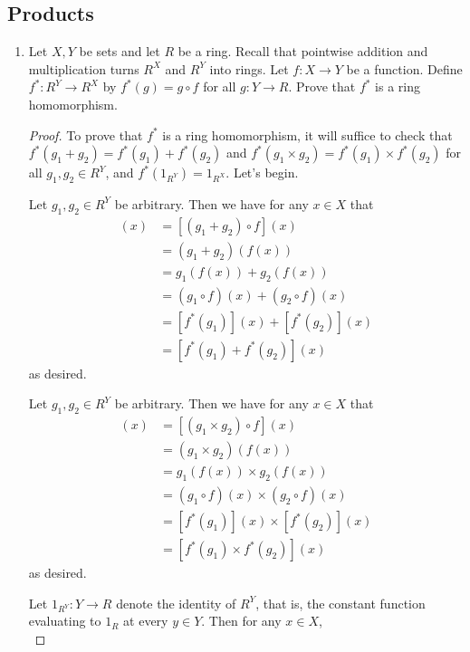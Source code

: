 \documentclass[../psets.tex]{subfiles}
\begin{document}
\subsection*{Products}
\begin{enumerate}[resume]
    \item Let $X,Y$ be sets and let $R$ be a ring. Recall that pointwise addition and multiplication turns $R^X$ and $R^Y$ into rings. Let $f:X\to Y$ be a function. Define $f^*:R^Y\to R^X$ by $f^*(g)=g\circ f$ for all $g:Y\to R$. Prove that $f^*$ is a ring homomorphism.
    \begin{proof}
        To prove that $f^*$ is a ring homomorphism, it will suffice to check that $f^*(g_1+g_2)=f^*(g_1)+f^*(g_2)$ and $f^*(g_1\times g_2)=f^*(g_1)\times f^*(g_2)$ for all $g_1,g_2\in R^Y$, and $f^*(1_{R^Y})=1_{R^X}$. Let's begin.\par\smallskip
        Let $g_1,g_2\in R^Y$ be arbitrary. Then we have for any $x\in X$ that
        \begin{align*}
            [f^*(g_1+g_2)](x) &= [(g_1+g_2)\circ f](x)\\
            &= (g_1+g_2)(f(x))\\
            &= g_1(f(x))+g_2(f(x))\\
            &= (g_1\circ f)(x)+(g_2\circ f)(x)\\
            &= [f^*(g_1)](x)+[f^*(g_2)](x)\\
            &= [f^*(g_1)+f^*(g_2)](x)
        \end{align*}
        as desired.\par
        Let $g_1,g_2\in R^Y$ be arbitrary. Then we have for any $x\in X$ that
        \begin{align*}
            [f^*(g_1\times g_2)](x) &= [(g_1\times g_2)\circ f](x)\\
            &= (g_1\times g_2)(f(x))\\
            &= g_1(f(x))\times g_2(f(x))\\
            &= (g_1\circ f)(x)\times(g_2\circ f)(x)\\
            &= [f^*(g_1)](x)\times[f^*(g_2)](x)\\
            &= [f^*(g_1)\times f^*(g_2)](x)
        \end{align*}
        as desired.\par
        Let $1_{R^Y}:Y\to R$ denote the identity of $R^Y$, that is, the constant function evaluating to $1_R$ at every $y\in Y$. Then for any $x\in X$,
        \begin{equation*}

\end{equation*}
\end{proof}
\end{enumerate}
\end{document}
